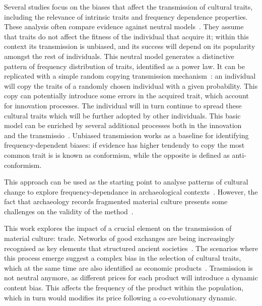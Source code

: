 \documentclass{wscpaperproc}
\begin{document}
Several studies focus on the biases that affect the transmission of cultural traits, including the relevance of intrinsic traits and frequency dependence properties. These analysis often compare evidence against neutral models~. They assume that traits do not affect the fitness of the individual that acquire it; within this context its transmission is unbiased, and its success will depend on its popularity amongst the rest of individuals. This neutral model generates a distinctive pattern of frequency distribution of traits, identified as a power law. It can be replicated with a simple random copying transmission mechanism~: an individual will copy the traits of a randomly chosen individual with a given probability. This copy can potentially introduce some errors in the acquired trait, which account for innovation processes. The individual will in turn continue to spread these cultural traits which will be further adopted by other individuals. This basic model can be enriched by several additional processes both in the innovation~ and the transmissio~. Unbiased transmission works as a baseline for identifying frequency-dependent biases: if evidence has higher tendendy to copy the most common trait is is known as conformism, while the opposite is defined as anti-conformism.

This approach can be used as the starting point to analyse patterns of cultural change to explore frequency-dependance in archaeological contexts~. However, the fact that archaeology records fragmented material culture presents some challenges on the validity of the method~.

This work explores the impact of a crucial element on the transmission of material culture: trade. Networks of good exchanges are being increasingly recognised as key elements that structured ancient societies~. The scenarios where this process emerge suggest a complex bias in the selection of cultural traits, which at the same time are also identified as economic products~. Trasmission is not neutral anymore, as different prices for each product will introduce a dynamic content bias. This affects the frequency of the product within the population, which in turn would modifies its price following a co-evolutionary dynamic.
\end{document}
